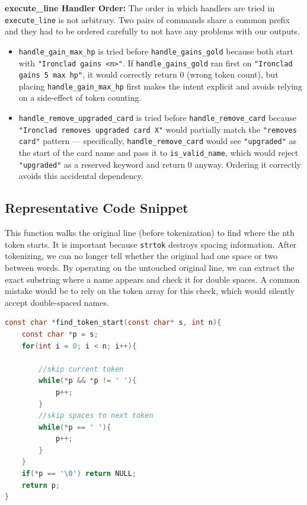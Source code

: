 \documentclass[12pt,a4paper]{article}
\begin{document}
\textbf{execute\_line Handler Order:} The order in which handlers are tried in \texttt{execute\_line} is not arbitrary. Two pairs of commands share a common prefix and they had to be ordered carefully to not have any problems with our outputs.

\begin{itemize}
    \item \texttt{handle\_gain\_max\_hp} is tried before \texttt{handle\_gains\_gold} because both start with \texttt{"Ironclad gains <n>"}. If \texttt{handle\_gains\_gold} ran first on \texttt{"Ironclad gains 5 max hp"}, it would correctly return 0 (wrong token count), but placing \texttt{handle\_gain\_max\_hp} first makes the intent explicit and avoids relying on a side-effect of token counting.
    \item \texttt{handle\_remove\_upgraded\_card} is tried before \texttt{handle\_remove\_card} because \texttt{"Ironclad removes upgraded card X"} would partially match the \texttt{"removes card"} pattern --- specifically, \texttt{handle\_remove\_card} would see \texttt{"upgraded"} as the start of the card name and pass it to \texttt{is\_valid\_name}, which would reject \texttt{"upgraded"} as a reserved keyword and return 0 anyway. Ordering it correctly avoids this accidental dependency.
\end{itemize}

\subsection{Representative Code Snippet}

This function walks the original line (before tokenization) to find where the nth token starts. It is important because \texttt{strtok} destroys spacing information. After tokenizing, we can no longer tell whether the original had one space or two between words. By operating on the untouched original line, we can extract the exact substring where a name appears and check it for double spaces. A common mistake would be to rely on the token array for this check, which would silently accept double-spaced names.

\begin{lstlisting}[language=C]
const char *find_token_start(const char* s, int n){
    const char *p = s;
    for(int i = 0; i < n; i++){

        //skip current token
        while(*p && *p != ' '){
            p++;
        }
        //skip spaces to next token
        while(*p == ' '){
            p++;
        }
    }
    if(*p == '\0') return NULL;
    return p;
}
\end{lstlisting}
\end{document}
